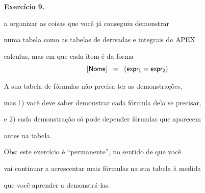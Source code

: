 \documentclass[oneside,12pt]{article}
\begin{document}
\newpage


{\bf Exercício 9.}

 a organizar as coisas que você já conseguiu demonstrar

numa tabela como as tabelas de derivadas e integrais do APEX

calculus, mas em que cada item é da forma
%
$$\mathsf{[Nome]} \;\; = \;\; (\mathsf{expr_1} = \mathsf{expr_2})$$

A sua tabela de fórmulas não precisa ter as demonstrações,

mas 1) você deve saber demonstrar cada fórmula dela se precisar,

e 2) cada demonstração só pode depender fórmulas que aparecem

antes na tabela.

\msk

Obs: este exercício é ``permanente'', no sentido de que você

vai continuar a acrescentar mais fórmulas na sua tabela à medida

que você aprender a demonstrá-las.


\end{document}
